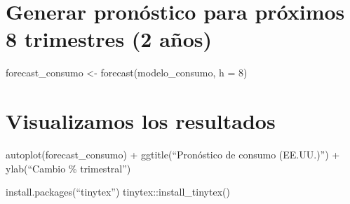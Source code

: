 \documentclass[
]{article}
\begin{document}
\section{Generar pronóstico para próximos 8 trimestres (2
años)}\label{generar-pronuxf3stico-para-pruxf3ximos-8-trimestres-2-auxf1os}

forecast\_consumo \textless- forecast(modelo\_consumo, h = 8)

\section{Visualizamos los resultados}\label{visualizamos-los-resultados}

autoplot(forecast\_consumo) + ggtitle(``Pronóstico de consumo
(EE.UU.)'') + ylab(``Cambio \% trimestral'')

install.packages(``tinytex'') tinytex::install\_tinytex()
\end{document}
